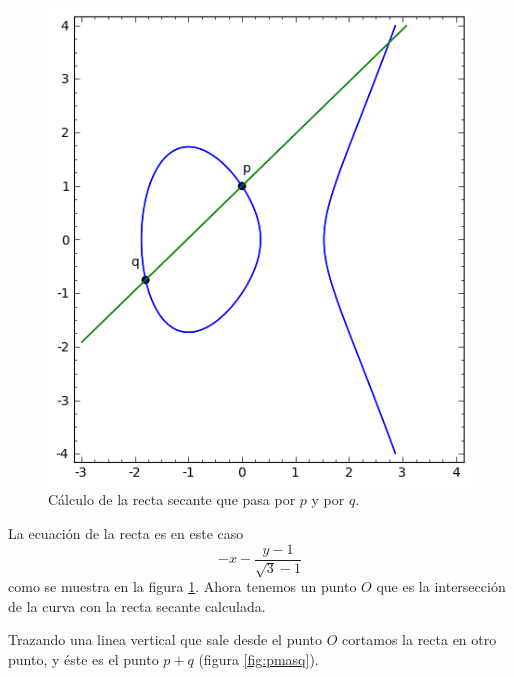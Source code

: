 \documentclass[a4,12pt]{article}
\begin{document}
\begin{figure}[h]
\begin{center}
\includegraphics[width=.5\linewidth]{imagenes/secantepuntos}
\end{center}
\caption{Cálculo de la recta secante que pasa por $p$ y por $q$.}
\label{fig:secantepuntos}
\end{figure}

La ecuación de la recta es en este caso $$ -x-\frac{y-1}{\sqrt{3}-1} $$ como se muestra en la figura \ref{fig:secantepuntos}. Ahora tenemos un punto $O$ que es la intersección de la curva con la recta secante calculada.

Trazando una linea vertical que sale desde el punto $O$ cortamos la recta en otro punto, y éste es el punto $p+q$ (figura \ref{fig:pmasq}).
\end{document}

